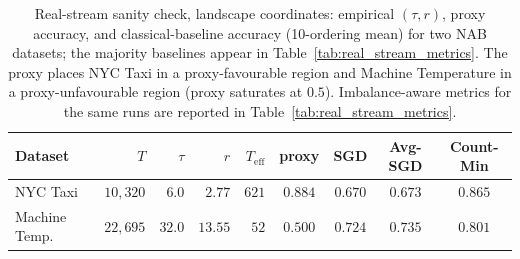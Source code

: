 \documentclass[sensors,article,submit,pdftex,moreauthors]{Definitions/mdpi}
\newcommand{\Teff}{T_{\mathrm{eff}}}
\providecommand{\DIFadd}[1]{{\protect\color{blue}#1}} %
\providecommand{\DIFdel}[1]{} %
\providecommand{\DIFaddFL}[1]{\DIFadd{#1}} %
\providecommand{\DIFdelFL}[1]{\DIFdel{#1}} %
\providecommand{\DIFaddbeginFL}{} %
\providecommand{\DIFaddendFL}{} %
\providecommand{\DIFdelbeginFL}{} %
\providecommand{\DIFdelendFL}{} %
\begin{document}
\begin{table}[t]
\centering
\caption{Real-stream sanity check, landscape coordinates: empirical $(\tau, r)$, proxy accuracy, \DIFaddbeginFL \DIFaddFL{and }\DIFaddendFL classical-baseline accuracy (\DIFdelbeginFL \DIFdelFL{10-seed }\DIFdelendFL \DIFaddbeginFL \DIFaddFL{10-ordering }\DIFaddendFL mean) \DIFdelbeginFL \DIFdelFL{, and the majority-class accuracy }\DIFdelendFL for two NAB datasets\DIFaddbeginFL \DIFaddFL{; the majority baselines appear in Table~\ref{tab:real_stream_metrics}}\DIFaddendFL . The proxy places NYC Taxi in a \DIFdelbeginFL \DIFdelFL{favourable }\DIFdelendFL \DIFaddbeginFL \DIFaddFL{proxy-favourable }\DIFaddendFL region and Machine Temperature in \DIFdelbeginFL \DIFdelFL{an unfavourable }\DIFdelendFL \DIFaddbeginFL \DIFaddFL{a proxy-unfavourable }\DIFaddendFL region (proxy saturates at $0.5$). Imbalance-aware metrics \DIFdelbeginFL \DIFdelFL{(balanced accuracy, $F_1$) }\DIFdelendFL for the same runs are reported \DIFdelbeginFL \DIFdelFL{separately }\DIFdelendFL in Table~\ref{tab:real_stream_metrics}.}
\label{tab:real_stream}
\begin{tabular}{@{}lrrrrcccc@{}}
\toprule
Dataset & $T$ & $\tau$ & $r$ & $\Teff$ & proxy & SGD & Avg-SGD & Count-Min \\
\midrule
NYC Taxi          & $10{,}320$ & $6.0$  & $2.77$  & $621$ & $0.884$ & $0.670$ & $0.673$ & $0.865$ \\
Machine Temp.\    & $22{,}695$ & $32.0$ & $13.55$ & $52$  & $0.500$ & $0.724$ & $0.735$ & $0.801$ \\
\bottomrule
\end{tabular}
\end{table}
\end{document}
